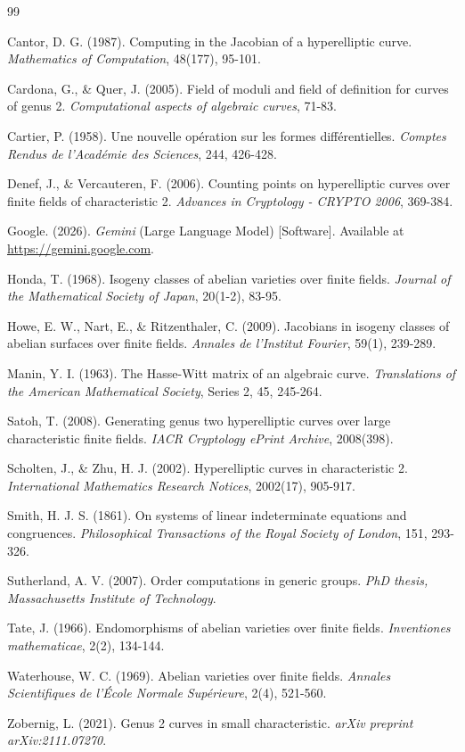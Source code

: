 \documentclass[letterpaper, 11pt]{article}
\begin{document}
\begin{thebibliography}{99}

Cantor, D. G. (1987). Computing in the Jacobian of a hyperelliptic curve. \textit{Mathematics of Computation}, 48(177), 95-101.

Cardona, G., \& Quer, J. (2005). Field of moduli and field of definition for curves of genus 2. \textit{Computational aspects of algebraic curves}, 71-83.

Cartier, P. (1958). Une nouvelle op\'{e}ration sur les formes diff\'{e}rentielles. \textit{Comptes Rendus de l'Acad\'{e}mie des Sciences}, 244, 426-428.

Denef, J., \& Vercauteren, F. (2006). Counting points on hyperelliptic curves over finite fields of characteristic 2. \textit{Advances in Cryptology - CRYPTO 2006}, 369-384.

Google. (2026). \textit{Gemini} (Large Language Model) [Software]. Available at \url{https://gemini.google.com}.

Honda, T. (1968). Isogeny classes of abelian varieties over finite fields. \textit{Journal of the Mathematical Society of Japan}, 20(1-2), 83-95.

Howe, E. W., Nart, E., \& Ritzenthaler, C. (2009). Jacobians in isogeny classes of abelian surfaces over finite fields. \textit{Annales de l'Institut Fourier}, 59(1), 239-289.

Manin, Y. I. (1963). The Hasse-Witt matrix of an algebraic curve. \textit{Translations of the American Mathematical Society}, Series 2, 45, 245-264.

Satoh, T. (2008). Generating genus two hyperelliptic curves over large characteristic finite fields. \textit{IACR Cryptology ePrint Archive}, 2008(398).

Scholten, J., \& Zhu, H. J. (2002). Hyperelliptic curves in characteristic 2. \textit{International Mathematics Research Notices}, 2002(17), 905-917.

Smith, H. J. S. (1861). On systems of linear indeterminate equations and congruences. \textit{Philosophical Transactions of the Royal Society of London}, 151, 293-326.

Sutherland, A. V. (2007). Order computations in generic groups. \textit{PhD thesis, Massachusetts Institute of Technology}.

Tate, J. (1966). Endomorphisms of abelian varieties over finite fields. \textit{Inventiones mathematicae}, 2(2), 134-144.

Waterhouse, W. C. (1969). Abelian varieties over finite fields. \textit{Annales Scientifiques de l'\'{E}cole Normale Sup\'{e}rieure}, 2(4), 521-560.

Zobernig, L. (2021). Genus 2 curves in small characteristic. \textit{arXiv preprint arXiv:2111.07270}.

\end{thebibliography}
\end{document}
